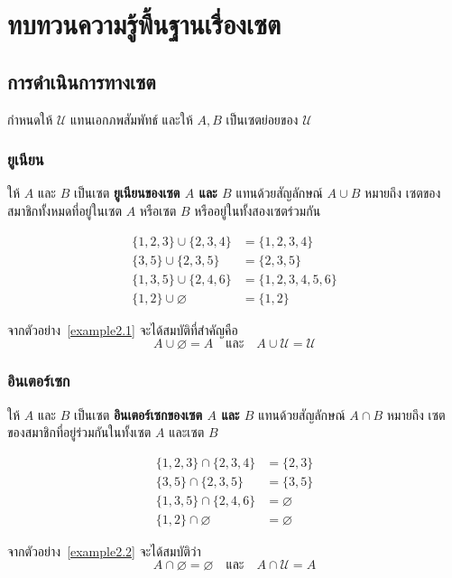 \chapter{ทบทวนความรู้พื้นฐานเรื่องเซต}
\section{การดำเนินการทางเซต}
กำหนดให้ $\mathcal{U}$ แทนเอกภพสัมพัทธ์ และให้ $A,B$ เป็นเซตย่อยของ $\mathcal{U}$
\subsection{ยูเนียน}
\noindent
ให้ $A$ และ $B$ เป็นเซต  
\textbf{ยูเนียนของเซต $A$ และ $B$} แทนด้วยสัญลักษณ์ $A \cup B$  
หมายถึง เซตของสมาชิกทั้งหมดที่อยู่ในเซต $A$ หรือเซต $B$ หรืออยู่ในทั้งสองเซตร่วมกัน

\begin{examplebox}\label{example2.1}
\begin{align*}
\{1,2,3\} \cup \{2,3,4\} &= \{1,2,3,4\}\\
\{3,5\} \cup \{2,3,5\} &= \{2,3,5\}\\
\{1,3,5\} \cup \{2,4,6\} &= \{1,2,3,4,5,6\} \\
\{1,2\} \cup \varnothing &= \{1,2\}
\end{align*}
\end{examplebox}

จากตัวอย่าง~\ref{example2.1} จะได้สมบัติที่สำคัญคือ  
\[
A \cup \varnothing = A 
\quad \text{และ} \quad 
A \cup \mathcal{U} = \mathcal{U}
\]

\newpage
\subsection{อินเตอร์เซก}
\noindent
ให้ $A$ และ $B$ เป็นเซต  
\textbf{อินเตอร์เซกของเซต $A$ และ $B$} แทนด้วยสัญลักษณ์ $A \cap B$  
หมายถึง เซตของสมาชิกที่อยู่ร่วมกันในทั้งเซต $A$ และเซต $B$

\begin{examplebox}\label{example2.2}
\begin{align*}
\{1,2,3\} \cap \{2,3,4\} &= \{2,3\}\\
\{3,5\} \cap \{2,3,5\} &= \{3,5\}\\
\{1,3,5\} \cap \{2,4,6\} &= \varnothing \\
\{1,2\} \cap \varnothing &= \varnothing
\end{align*}
\end{examplebox}

จากตัวอย่าง~\ref{example2.2} จะได้สมบัติว่า  
\[
A \cap \varnothing = \varnothing 
\quad \text{และ} \quad 
A \cap \mathcal{U} = A
\]


